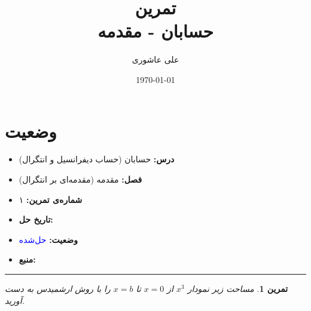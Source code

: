 \documentclass[a4paper,12pt]{article}
\title{%
	\Huge \textbf{تمرین} \\[0.3cm]
	\Large حسابان - مقدمه
}
\author{علی عاشوری}
\date{\today}
\theoremstyle{exercise}
\newtheorem{exercise}{تمرین}
\begin{document}
	
	\maketitle
	
	\section*{وضعیت}
	\begin{itemize}
		\item \textbf{درس:} حسابان (حساب دیفرانسیل و انتگرال)
		\item \textbf{فصل:} مقدمه (مقدمه‌ای بر انتگرال)
		\item \textbf{شماره‌ی تمرین:} ۱
		\item \textbf{تاریخ حل:} 
		\item \textbf{وضعیت:} \textcolor{blue}{حل‌شده}
		\item \textbf{منبع:} 
	\end{itemize}
	\rule{\textwidth}{0.4pt}
	
	\begin{exercise}
		مساحت زیر نمودار
		$x^3$
		از
		$x=0$
		تا
		$x=b$
		را با روش ارشمیدس به دست آورید.
	\end{exercise}
	
	\bigskip
	
\end{document}
